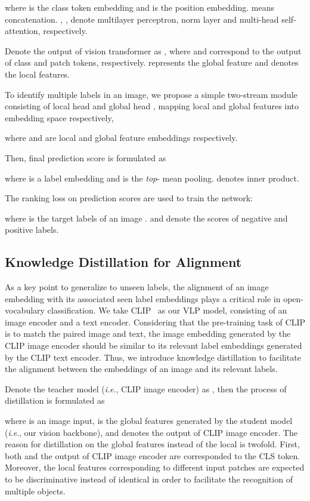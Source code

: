 \documentclass[letterpaper]{article} \usepackage{aaai23}  \usepackage{times}  \usepackage{helvet}  \usepackage{courier}  \usepackage[hyphens]{url}  \usepackage{graphicx} \urlstyle{rm} \def\UrlFont{\rm}  \usepackage{natbib}  \usepackage{caption} \frenchspacing  \setlength{\pdfpagewidth}{8.5in}  \setlength{\pdfpageheight}{11in}
\newcommand{\ie}{\textit{i}.\textit{e}.}
\begin{document}
where  is the class token embedding and  is the position embedding. 
 means concatenation.
, ,  denote multilayer perceptron, norm layer and multi-head self-attention, respectively.

Denote the output of vision transformer as , where  and  correspond to the output of class and patch tokens, respectively. 
 represents the global feature and  denotes the local features.
\par
To identify multiple labels in an image, we propose a simple two-stream module consisting of local head  and global head , mapping local and global features into embedding space respectively, \par

where  and  are local and global feature embeddings respectively. \par
Then, final prediction score is formulated as

where  is a label embedding and  is the \textit{top}- mean pooling.  denotes inner product. \par
The ranking loss  on prediction scores are used to train the network:

where  is the target labels of an image .  and  denote the scores of negative and positive labels.

\subsection{Knowledge Distillation for Alignment}
As a key point to generalize to unseen labels, the alignment of an image embedding with its associated seen label embeddings plays a critical role in open-vocabulary classification.
We take CLIP~\cite{clip} as our VLP model, consisting of an image encoder and a text encoder.
Considering that the pre-training task of CLIP is to match the paired image and text, the image embedding generated by the CLIP image encoder should be similar to its relevant label embeddings generated by the CLIP text encoder.
Thus, we introduce knowledge distillation to facilitate the alignment between the embeddings of an image and its relevant labels.

Denote the teacher model (\ie, CLIP image encoder) as , then the process of distillation is formulated as

where  is an image input,  is the global features generated by the student model (\ie, our vision backbone), and  denotes the output of CLIP image encoder.
The reason for distillation on the global features instead of the local is twofold. 
First, both  and the output of CLIP image encoder are corresponded to the CLS token.
Moreover, the local features  corresponding to different input patches are expected to be discriminative instead of identical in order to facilitate the recognition of multiple objects.   
\end{document}
